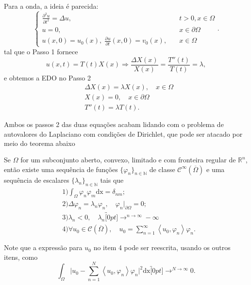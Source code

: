 \documentclass[../pde_notes.tex]{subfiles}
\begin{document}
Para a onda, a ideia é parecida:
\[
	\left\{\begin{array}{ll}
		\frac{\partial^{2}u}{\partial t^{2}} = \Delta u,                           & \quad t > 0, x\in \Omega   \\
		u = 0,                                                                     & \quad x\in \partial \Omega \\
		u(x, 0) = u_{0}(x),\; \frac{\partial^{}u}{\partial t^{}}(x, 0) = v_{0}(x), & \quad x\in \Omega
	\end{array}\right..
\]
tal que o Passo 1 fornece
\[
	u(x,t) = T(t)X(x) \Rightarrow \frac{\Delta X(x)}{X(x)} = \frac{T''(t)}{T(t)} = \lambda ,
\]
e obtemos a EDO no Passo 2
\begin{align*}
	 & \Delta X(x) = \lambda X(x), \quad x\in \Omega \\
	 & X(x) = 0, \quad x\in \partial \Omega          \\
	 & T''(t) = \lambda T(t).
\end{align*}

Ambos os passos 2 das duas equações acabam lidando com o problema de autovalores do Laplaciano com condições de Dirichlet, que pode ser atacado por meio do teorema abaixo
\begin{theorem*}
	Se \(\Omega \) for um subconjunto aberto, convexo, limitado e com fronteira regular de \(\mathbb{R}^{n}\), então existe uma sequência de funções \(\{\varphi_{n}\}_{n\in \mathbb{N}}\) de classe \(\mathcal{C}^{\infty}(\overline{\Omega })\) e uma sequência de escalares \(\{\lambda_{n}\}_{n\in \mathbb{N}}\) tais que
	\begin{align*}
		 & 1) \int_{\Omega }^{}\varphi_{n}\varphi_{m} \mathrm{dx} = \delta_{nm};                                                                     \\
		 & 2) \Delta \varphi_{n} = \lambda_{n}\varphi_{n},\quad \varphi_{n}|_{\partial \Omega } = 0;                                                 \\
		 & 3) \lambda_{n} < 0, \quad \lambda_{n}\overbracket[0pt]{\longrightarrow}^{n\to \infty}-\infty                                              \\
		 & 4) \forall u_{0}\in \mathcal{C}(\overline{\Omega }),\quad u_{0} = \sum\limits_{n=1}^{\infty}\left< u_{0}, \varphi_{n} \right>\varphi_{n}.
	\end{align*}
\end{theorem*}
Note que a expressão para \(u_{0}\) no item 4 pode ser reescrita, usando os outros itens, como
\[
	\int_{\Omega }^{}\biggl\vert u_{0} - \sum\limits_{n=1}^{N}\left< u_{0}, \varphi_{n} \right>\varphi_{n} \biggr\vert^{2} \mathrm{dx}\overbracket[0pt]{\longrightarrow}^{N\to \infty}0.
\]
\end{document}
